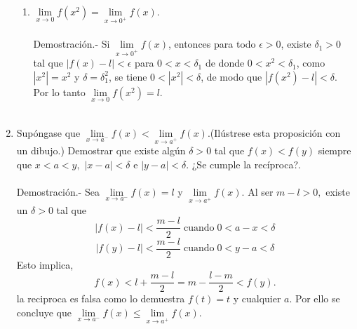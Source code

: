 \begin{enumerate}
\begin{enumerate}[\bfseries (i)]
    \item $\lim\limits_{x\to 0} f(x^2) = \lim\limits_{x\to 0^+} f(x)$.\\\\
	Demostración.-\; Si $\lim\limits_{x\to 0^+}f(x)$, entonces para todo $\epsilon>0$, existe $\delta_1>0$ tal que $|f(x)-l|<\epsilon$ para $0<x<\delta_1$ de donde $0<x^2<\delta_1$, como $|x^2|=x^2$ y $\delta=\delta_1^2$, se tiene $0<|x^2|<\delta$, de modo que $|f(x^2)-l|<\delta$. Por lo tanto $\lim\limits_{x\to 0}f(x^2)=l$.\\\\ 

\end{enumerate}

\item Supóngase que $\lim\limits_{x\to a^-}f(x)<\lim\limits_{x\to a^+}f(x).$(Ilústrese esta proposición con un dibujo.) Demostrar que existe algún $\delta > 0$ tal que $f(x)<f(y)$ siempre que $x<a<y,$ $|x-a|<\delta$ e $|y-a|<\delta$. ¿Se cumple la recíproca?.\\\\
    Demostración.-\; Sea $\lim\limits_{x\to a^-}f(x)=l$ y $\lim\limits_{x\to a^+}f(x)$. Al ser $m-l>0,$ existe un $\delta>0$ tal que 
    $$|f(x)-l|<\dfrac{m-l}{2}\; \mbox{cuando}\; 0<a-x<\delta$$
    $$|f(y)-l|<\dfrac{m-l}{2}\; \mbox{cuando}\; 0<y-a<\delta$$
    Esto implica, $$f(x)<l+\dfrac{m-l}{2}=m-\dfrac{l-m}{2}<f(y).$$
    la reciproca es falsa como lo demuestra $f(t)=t$ y cualquier $a$. Por ello se concluye que $\lim\limits_{x\to a^-}f(x) \leq \lim\limits_{x\to a^+}f(x)$.\\\\


\end{enumerate}
